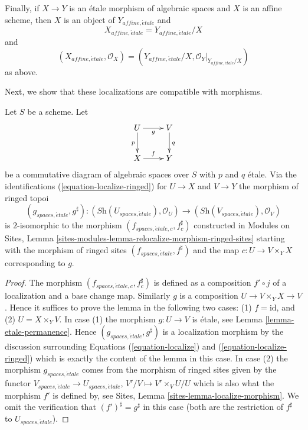 \medskip\noindent
Finally, if $X \to Y$ is an \'etale morphism of algebraic spaces and $X$ is
an affine scheme, then $X$ is an object of $Y_{affine, \acute{e}tale}$ and
\begin{equation}
\label{equation-localize-at-affine}
X_{affine, \acute{e}tale} = Y_{affine, \acute{e}tale}/X
\end{equation}
and
\begin{equation}
\label{equation-localize-at-affine-ringed}
(X_{affine, \acute{e}tale}, \mathcal{O}_X) =
(Y_{affine, \acute{e}tale}/X, \mathcal{O}_Y|_{Y_{affine, \acute{e}tale}/X})
\end{equation}
as above.

\medskip\noindent
Next, we show that these localizations are compatible with morphisms.

\begin{lemma}
\label{lemma-relocalize-morphism}
Let $S$ be a scheme. Let
$$
\xymatrix{
U \ar[d]_p \ar[r]_g & V \ar[d]^q \\
X \ar[r]^f & Y
}
$$
be a commutative diagram of algebraic spaces over $S$ with $p$ and $q$ \'etale.
Via the identifications
(\ref{equation-localize-ringed}) for $U \to X$ and $V \to Y$
the morphism of ringed topoi
$$
(g_{spaces, \acute{e}tale}, g^\sharp) :
(\textit{Sh}(U_{spaces, \acute{e}tale}), \mathcal{O}_U)
\longrightarrow
(\textit{Sh}(V_{spaces, \acute{e}tale}), \mathcal{O}_V)
$$
is $2$-isomorphic to the morphism $(f_{spaces, \acute{e}tale, c}, f_c^\sharp)$
constructed in
Modules on Sites,
Lemma \ref{sites-modules-lemma-relocalize-morphism-ringed-sites}
starting with the morphism of ringed sites
$(f_{spaces, \acute{e}tale}, f^\sharp)$ and
the map $c : U \to V \times_Y X$ corresponding to $g$.
\end{lemma}

\begin{proof}
The morphism $(f_{spaces, \acute{e}tale, c}, f_c^\sharp)$ is defined as a
composition $f' \circ j$
of a localization and a base change map. Similarly $g$ is a composition
$U \to V \times_Y X \to V$. Hence it suffices to prove
the lemma in the following two cases: (1) $f = \text{id}$, and
(2) $U = X \times_Y V$. In case (1) the morphism $g : U \to V$ is
\'etale, see
Lemma \ref{lemma-etale-permanence}.
Hence $(g_{spaces, \acute{e}tale}, g^\sharp)$ is a localization morphism
by the discussion surrounding
Equations (\ref{equation-localize}) and
(\ref{equation-localize-ringed})
which is exactly the content of the lemma in this case.
In case (2) the morphism $g_{spaces, \acute{e}tale}$
comes from the morphism of ringed sites given by the functor
$V_{spaces, \acute{e}tale} \to U_{spaces, \acute{e}tale}$,
$V'/V \mapsto V' \times_V U/U$
which is also what the morphism $f'$ is defined by, see
Sites, Lemma \ref{sites-lemma-localize-morphism}.
We omit the verification that $(f')^\sharp = g^\sharp$
in this case (both are the restriction of $f^\sharp$
to $U_{spaces, \acute{e}tale}$).
\end{proof}

